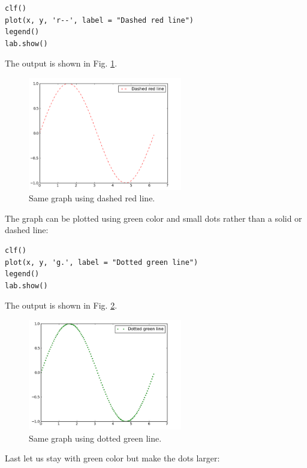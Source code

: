 \begin{verbatim}
clf()
plot(x, y, 'r--', label = "Dashed red line")
legend()
lab.show()
\end{verbatim}
The output is shown in Fig. \ref{fig:plot3}.\\[-7mm]


\begin{figure}[!ht]
\begin{center}
\includegraphics[width=0.6\textwidth]{imgp/plot3.png}
\end{center}
\vspace{-6mm}
\caption{Same graph using dashed red line.}
\vspace{-1cm}
\label{fig:plot3}
\end{figure}
\newpage
\noindent
The graph can be plotted using green color and small dots rather than 
a solid or dashed line:

\begin{verbatim}
clf()
plot(x, y, 'g.', label = "Dotted green line")
legend()
lab.show()
\end{verbatim}
The output is shown in Fig. \ref{fig:plot4}.

\begin{figure}[!ht]
\begin{center}
\includegraphics[width=0.6\textwidth]{imgp/plot4.png}
\end{center}
\vspace{-6mm}
\caption{Same graph using dotted green line.}
\label{fig:plot4}
\end{figure}
\noindent
\noindent
Last let us stay with green color but make the dots larger:

